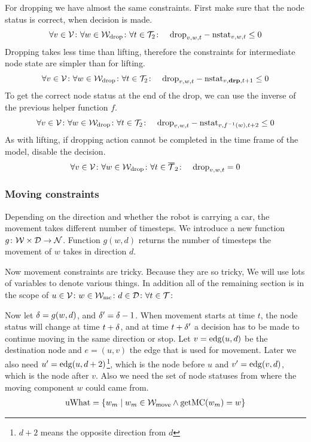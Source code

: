 For dropping we have almost the same constraints. First make sure that the node
status is correct, when decision is made.
\begin{align}
    &\forall v \in \mathcal{V} \colon \forall w \in \mathcal{W}_\mathrm{drop} \colon \forall t \in \mathcal{T}_2 \colon
    &\mathrm{drop}_{v,w,t} - \mathrm{nstat}_{v,w,t} \leq 0
\end{align}
Dropping takes less time than lifting, therefore the constraints for
intermediate node state are simpler than for lifting.
\begin{align}
    &\forall v \in \mathcal{V} \colon \forall w \in \mathcal{W}_\mathrm{drop} \colon \forall t \in \mathcal{T}_2 \colon
    &\mathrm{drop}_{v,w,t} - \mathrm{nstat}_{v,\text{\bf drp},t+1} \leq 0
\end{align}
To get the correct node status at the end of the drop, we can use the inverse
of the previous helper function $f$.
\begin{align}
    &\forall v \in \mathcal{V} \colon \forall w \in \mathcal{W}_\mathrm{drop} \colon \forall t \in \mathcal{T}_2 \colon
    &\mathrm{drop}_{v,w,t} - \mathrm{nstat}_{v,f^{-1}(w),t+2} \leq 0
\end{align}
As with lifting, if dropping action cannot be completed in the time frame of
the model, disable the decision.
\begin{align}
    &\forall v \in \mathcal{V} \colon \forall w \in \mathcal{W}_\mathrm{drop} \colon \forall t \in \overline{\mathcal{T}}_2
    \colon &\mathrm{drop}_{v,w,t} = 0
\end{align}

\subsubsection{Moving constraints}
Depending on the direction and whether the robot is carrying a car, the
movement takes different number of timesteps. We introduce a new function $g
\colon \mathcal{W} \times \mathcal{D} \to \mathcal{N}$. Function $g(w,d)$ returns the number of
timesteps the movement of $w$ takes in direction $d$. 

Now movement constraints are tricky. Because they are so tricky, We will use
lots of variables to denote various things. In addition all of the remaining
section is in the scope of $u \in \mathcal{V} \colon w \in \mathcal{W}_\mathrm{mc} \colon d \in \mathcal{D} \colon
\forall t \in \mathcal{T} \colon$

Now let $\delta = g(w,d)$, and $\delta' = \delta-1$. When movement starts at time $t$,
the node status will change at time $t+\delta$, and at time $t+\delta'$ a decision
has to be made to continue moving in the same direction or stop. Let $v =
\mathrm{edg}(u,d)$ be the destination node and $e = (u,v)$ the edge that is used for
movement. Later we also need $u' = \mathrm{edg}(u,d+2)$\footnote{$d+2$ means the
opposite direction from $d$}, which is the node before $u$ and $v' =
\mathrm{edg}(v,d)$, which is the node after $v$. Also we need the set of node statuses
from where the moving component $w$ could came from.
\begin{align}
    \mathrm{uWhat} = \{w_m \mid w_m \in \mathcal{W}_\mathrm{move} \wedge \mathrm{getMC}(w_m) = w\}
\end{align}

